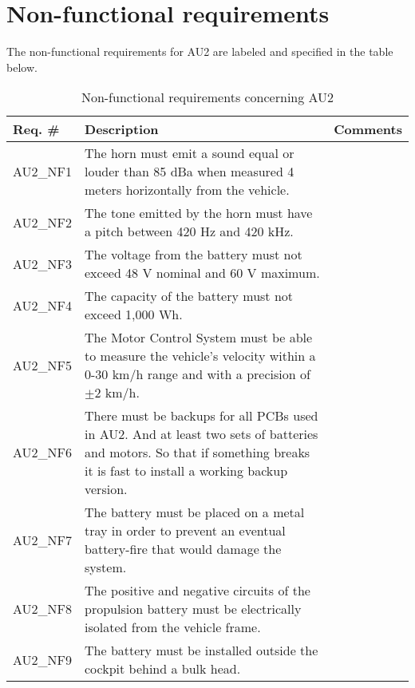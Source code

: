 \section{Non-functional requirements}
The non-functional requirements for AU2 are labeled and specified in the table below\cite{ShellRequirements}.

\begin{table}[h!]
	\centering
	\label{my-label}
	\begin{tabular}{|p{2 cm}|p{7 cm}|p{4 cm}|}
		\hline
		\textbf{Req. \#} & \textbf{Description} & \textbf{Comments} \\\hline
		AU2\_NF1	& The horn must emit a sound equal or louder than 85 dBa when measured 4 meters horizontally from the vehicle. &	\\\hline
		AU2\_NF2	& The tone emitted by the horn must have a pitch between 420 Hz and 420 kHz. &	\\\hline
		AU2\_NF3	& The voltage from the battery must not exceed 48 V nominal and 60 V maximum. &	\\\hline
		AU2\_NF4	& The capacity of the battery must not exceed 1,000 Wh. &	\\\hline
		AU2\_NF5	& The Motor Control System must be able to measure the vehicle's velocity within a 0-30 km/h range and with a precision of $\pm$2 km/h. &	\\\hline
		AU2\_NF6	& There must be backups for all PCBs used in AU2. And at least two sets of batteries and motors. So that if something breaks it is fast to install a working backup version. &	\\\hline
		AU2\_NF7	& The battery must be placed on a metal tray in order to prevent an eventual battery-fire that would damage the system. &   \\\hline
		AU2\_NF8	& The positive and negative circuits of the propulsion battery must be electrically isolated from the vehicle frame. &   \\\hline
		AU2\_NF9	& The battery must be installed outside the cockpit behind a bulk head. &   \\\hline
	\end{tabular}
	\caption{Non-functional requirements concerning AU2}
\end{table}
